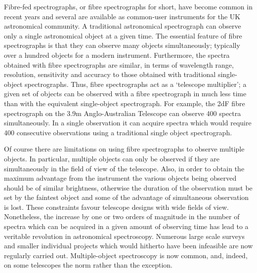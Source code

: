 \documentclass[chapters,twoside,11pt]{starlink}
\begin{document}
Fibre-fed spectrographs, or fibre spectrographs for short, have become
common in recent years and several are available as common-user
instruments for the UK astronomical community.  A traditional
astronomical spectrograph can observe only a single astronomical object
at a given time.  The essential feature of fibre spectrographs is that
they can observe many objects simultaneously; typically over a hundred
objects for a modern instrument.  Furthermore, the spectra obtained with
fibre spectrographs are similar, in terms of wavelength range, resolution,
sensitivity and accuracy to those obtained with traditional single-object
spectrographs.  Thus, fibre spectrographs act as a `telescope multiplier';
a given set of objects can be observed with a fibre spectrograph in much
less time than with the equivalent single-object spectrograph.  For
example, the 2dF fibre spectrograph on the 3.9m Anglo-Australian Telescope
can observe 400 spectra simultaneously.  In a single observation it can
acquire spectra which would require 400 consecutive observations using a
traditional single object spectrograph.

Of course there are limitations on using fibre spectrographs to observe
multiple objects.  In particular, multiple objects can only be observed if
they are simultaneously in the field of view of the telescope.  Also, in
order to obtain the maximum advantage from the instrument the various
objects being observed should be of similar brightness, otherwise the
duration of the observation must be set by the faintest object and some
of the advantage of simultaneous observation is lost.  These constraints
favour telescope designs with wide fields of view.  Nonetheless, the
increase by one or two orders of magnitude in the number of spectra which
can be acquired in a given amount of observing time has lead to a
veritable revolution in astronomical spectroscopy.  Numerous large scale
surveys and smaller individual projects which would hitherto have been
infeasible are now regularly carried out.  Multiple-object spectroscopy
is now common, and, indeed, on some telescopes the norm rather than the
exception.
\end{document}
